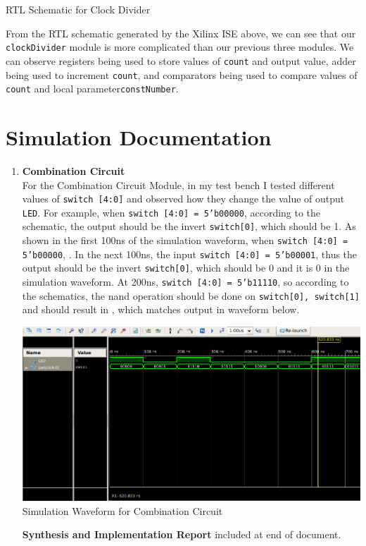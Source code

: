 \documentclass{article}
\begin{document}
\begin{enumerate}
\begin{center}
        \caption{RTL Schematic for Clock Divider}
    \end{center}
    From the RTL schematic generated by the Xilinx ISE above, we can see that our \texttt{clockDivider} module is more complicated than our previous three modules. We can observe registers being used to store values of \texttt{count} and output value, adder being used to increment \texttt{count}, and comparators being used to compare values of \texttt{count} and local parameter\texttt{constNumber}.
\end{enumerate}

\section{Simulation Documentation}
\begin{enumerate}
    \item \textbf{Combination Circuit} \\
    For the Combination Circuit Module, in my test bench I tested different values of \texttt{switch [4:0]} and observed how they change the value of output \texttt{LED}. For example, when \texttt{switch [4:0] = 5'b00000}, according to the schematic, the output  should be the invert \texttt{switch[0]}, which should be 1. As shown in the first 100ns of the simulation waveform, when \texttt{switch [4:0] = 5'b00000}, . In the next 100ns, the input \texttt{switch [4:0] = 5'b00001}, thus the output  should be the invert \texttt{switch[0]}, which should be 0 and it is 0 in the simulation waveform. At 200ns, \texttt{switch [4:0] = 5'b11110}, so according to the schematics, the nand operation should be done on \texttt{switch[0], switch[1]} and should result in , which matches output in waveform below.
    \begin{center}
        \includegraphics[scale=0.4]{tb_comb.png} \\
        \caption{Simulation Waveform for Combination Circuit}
    \end{center}
    \par
    \textbf{Synthesis and Implementation Report} included at end of document.
    

\end{enumerate}
\end{document}
